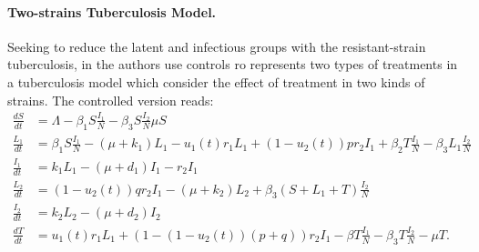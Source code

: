 \paragraph{Two-strains Tuberculosis Model.}
Seeking to reduce the latent and infectious groups with the 
resistant-strain tuberculosis, in \cite{Lenhart2002} the authors  use 
controls ro represents 	two types of treatments in a tuberculosis model 
which consider the effect of treatment in two kinds of strains. The 
controlled version reads:
%
%	
%
%
	\begin{equation}\label{eqn:MDR-TB_model}
	  \begin{aligned}
	    \frac{dS}{dt} &=
		    \Lambda - \beta_1 S \frac{I_1}{N} 
		    - \beta_3 S \frac{I_2}{N}
		    \mu S
		  \\
		  \frac{L_1}{dt} &=
			  \beta_1 S \frac{I_1}{N}
			  - (\mu + k_1) L_1
			  - u_1 (t) r_1 L_1
			  + (1 - u_2 (t)) p r_2 I_1
				+ \beta_2 T \frac{I_1}{N}
				- \beta_3 L_1 \frac{I_2}{N}
			\\
			\frac{I_1}{dt} &= 
				k_1 L_1
				- (\mu + d_1) I_1
				-r_2 I_1
			\\
			\frac{L_2}{dt} &=
				(1 - u_2(t)) q r_2 I_1
				- (\mu + k_2) L_2
				+ \beta_3 (S + L_1 + T) \frac{I_2}{N}
			\\
			\frac{I_2}{dt} &=
				k_2 L_2 - (\mu + d_2) I_2
			\\
			\frac{d T}{dt} &=
				u_1(t) r_1 L_1
				+ (1 - (1 - u_2(t))(p + q)) r_2 I_1
				- \beta T \frac{I_1}{N}
				- \beta_3 T \frac{I_2}{N}
				-\mu T.
	  \end{aligned}
	\end{equation}

